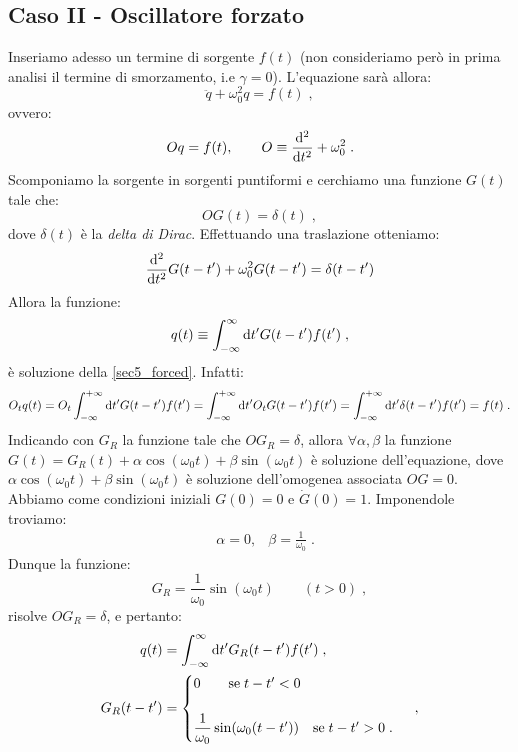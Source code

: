 \subsection{Caso II - Oscillatore forzato}
Inseriamo adesso un termine di sorgente $f(t)$ (non consideriamo però in prima analisi il termine di smorzamento, i.e $\gamma=0$). L'equazione sarà allora:
\begin{equation}
\ddot{q}+\omega_0^2q=f(t)\;, \label{sec5_forced}
\end{equation}
ovvero:
\begin{equation}
Oq=f(t), \qquad O\equiv\frac{\diff^2}{\diff[t^2]}+\omega_0^2\;.
\end{equation}
Scomponiamo la sorgente in sorgenti puntiformi e cerchiamo una funzione $G(t)$ tale che:
\begin{equation}
OG(t)=\delta(t)\;,
\end{equation}
dove $\delta(t)$ è la \textit{delta di Dirac}. Effettuando una traslazione otteniamo:
\begin{equation}
\frac{\diff^2}{\diff[t^2]}G(t-t')+\omega_0^2G(t-t')=\delta(t-t')
\end{equation}
Allora la funzione:
\begin{equation}
q(t)\equiv \int_{-\infty}^{\infty} \diff[t']G(t-t')f(t')\;,
\end{equation}
è soluzione della \eqref{sec5_forced}. Infatti:
\begin{equation}
O_tq(t)=O_t\int_{-\infty}^{+\infty}\diff{t'}G(t-t')f(t')=\int_{-\infty}^{+\infty}\diff{t'}O_tG(t-t')f(t')=\int_{-\infty}^{+\infty}\diff{t'}\delta(t-t')f(t')=f(t)\;.
\end{equation}
Indicando con $G_R$ la funzione tale che $OG_R=\delta$, allora $\forall \alpha,\beta$ la funzione $G(t)=G_R(t)+\alpha\cos(\omega_0 t)+\beta\sin(\omega_0 t)$ è soluzione dell'equazione, dove $\alpha\cos(\omega_0 t)+\beta\sin(\omega_0 t)$ è soluzione dell'omogenea associata $OG=0$. Abbiamo come condizioni iniziali $G(0)=0$ e $\dot{G}(0)=1$. Imponendole troviamo:
\begin{align}
&\alpha=0, &\beta=\frac{1}{\omega_0}\;.
\end{align}
Dunque la funzione:
\begin{equation}
G_R=\frac{1}{\omega_0}\sin(\omega_0 t)\qquad (t>0)\;,
\end{equation}
risolve $OG_R=\delta$, e pertanto:
\begin{align}
q(t) &=\int_{-\infty}^{\infty}\diff{t'}G_R(t-t')f(t')\;, \notag \\
G_R(t-t') &=\begin{cases}
0\qquad \mbox{se}\; t-t'<0 \\
\\
\dfrac{1}{\omega_0}\sin(\omega_0(t-t'))\quad \mbox{se}\;t-t'>0\;.
\end{cases}\;,
\end{align}
